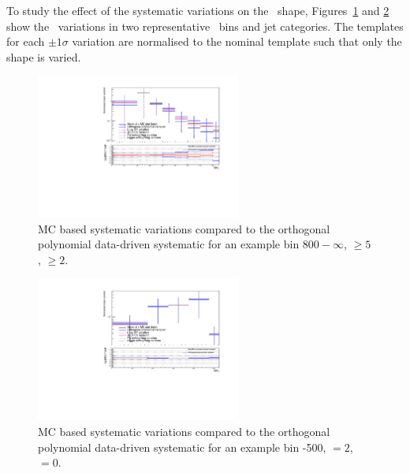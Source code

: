 To study the effect of the systematic variations on the \mht~shape, 
Figures~\ref{fig:mcCompLow} and \ref{fig:mcCompHigh} show the \mht~variations in two representative \scalht~bins 
and jet categories. The templates for each $\pm 1 \sigma$ variation are normalised to the
nominal template such that only the shape is varied.

\begin{figure}[h!]
  \centering
  \includegraphics[width=0.6\textwidth]{Figures/backgroundPrediction/mcComparison6fb/totalSMS-T1tttt_mGluino-1000_mLSP-100_25ns_mht_ge5j_ge3b_800.pdf}
  \caption{\label{fig:mcCompLow} MC based systematic variations compared to the orthogonal 
  polynomial data-driven systematic for an example bin \scalht $800-\infty$, \njet $\geq 5$, \nb $\geq 2$.}
\end{figure}
\begin{figure}[h!]
  \centering
  \includegraphics[width=0.6\textwidth]{Figures/backgroundPrediction/mcComparison6fb/totalSMS-T1tttt_mGluino-1000_mLSP-100_25ns_mht_eq2j_eq0b_400.pdf}
  \caption{\label{fig:mcCompHigh} MC based systematic variations compared to the 
orthogonal polynomial data-driven systematic for an example bin -500, \njet $= 2$, \nb $= 0$.}
\end{figure}



